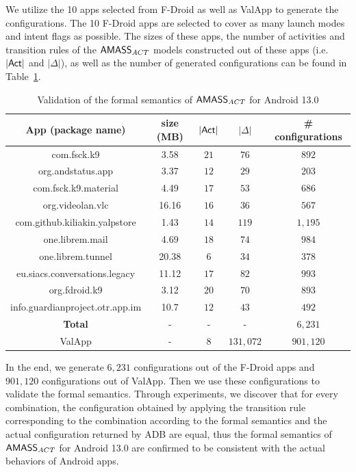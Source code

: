 We utilize the 10 apps selected from F-Droid as well as ValApp to generate the configurations. The 10 F-Droid apps are selected to cover as many launch modes and intent flags as possible. The sizes of these apps, the number of activities and transition rules of the  $\textsf{AMASS}_{ACT}$ models constructed out of these apps (i.e. $|{\sf Act}|$ and $|\Delta|$), as well as the number of generated configurations can be found in Table~\ref{tab-val-act}. 
\begin{table}[htbp]
    \centering
    \begin{tabular}{|c|c|c|c|c|}
    \hline
    \textbf{App (package name)} & size (MB) & $|{\sf Act}|$ & $|\Delta|$ & \# configurations \\
    \hline
    com.fsck.k9 & 3.58 & $21$ & $76$ & $892$\\
    \hline
    org.andstatus.app & 3.37 & $12$ & $29$ & $203$\\
    \hline
    com.fsck.k9.material & 4.49 & $17$ & $53$ & $686$\\
    \hline
    org.videolan.vlc & 16.16 & $16$ & $36$ & $567$\\
    \hline
    com.github.kiliakin.yalpstore & 1.43 & $14$ & $119$ & $1,195$\\
    \hline
    one.librem.mail & 4.69 & $18$ & $74$ & $984$\\
    \hline
    one.librem.tunnel & 20.38 & $6$ & $34$ & $378$\\
    \hline
    eu.siacs.conversations.legacy & 11.12 & $17$ & $82$ & $993$\\
    \hline
    org.fdroid.k9 & 3.12 & $20$ & $70$ & $893$ \\
    \hline
    info.guardianproject.otr.app.im & 10.7 & $12$ & $43$ & $492$  \\
    \hline
    {\textbf{Total}} & - & - & - & $6,231$  \\
    \hline
    ValApp & - & $8$  & $131,072$ & $901,120$\\
    \hline
    \end{tabular}
    \caption{Validation of the formal semantics of $\textsf{AMASS}_{ACT}$ for Android 13.0}
    \label{tab-val-act}
\end{table}
%
In the end, we generate $6,231$ configurations out of the F-Droid apps and $901,120$ configurations out of ValApp. Then we use these configurations to validate the formal semantics. Through experiments, we discover that for every combination, the configuration obtained by applying the transition rule corresponding to the combination according to the formal semantics and the actual configuration returned by ADB are equal, thus the formal semantics of $\textsf{AMASS}_{ACT}$ for Android 13.0 are confirmed to be consistent with the actual behaviors of Android apps.  

